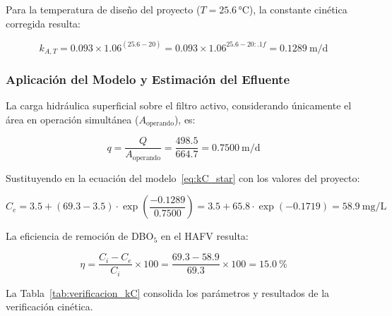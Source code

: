 \documentclass[12pt,a4paper]{article}
\begin{document}
Para la temperatura de diseño del proyecto ($T = 25.6$\,°C), la constante cinética corregida resulta:

\begin{equation}
k_{A,T} = 0.093 \times 1.06^{(25.6 - 20)} = 0.093 \times 1.06^{25.6 - 20:.1f} = 0.1289\ \text{m/d}
\end{equation}

\subsubsection*{Aplicación del Modelo y Estimación del Efluente}

La carga hidráulica superficial sobre el filtro activo, considerando únicamente el área en operación simultánea ($A_\text{operando}$), es:

\begin{equation}
q = \frac{Q}{A_\text{operando}} = \frac{498.5}{664.7} = 0.7500\ \text{m/d}
\end{equation}

Sustituyendo en la ecuación del modelo~\eqref{eq:kC_star} con los valores del proyecto:

\begin{equation}
C_e = 3.5 + (69.3 - 3.5) \cdot \exp\!\left(\frac{-0.1289}{0.7500}\right) = 3.5 + 65.8 \cdot \exp(-0.1719) = 58.9\ \text{mg/L}
\end{equation}

La eficiencia de remoción de DBO$_5$ en el HAFV resulta:

\begin{equation}
\eta = \frac{C_i - C_e}{C_i} \times 100 = \frac{69.3 - 58.9}{69.3} \times 100 = 15.0\ \%
\end{equation}

La Tabla~\ref{tab:verificacion_kC} consolida los parámetros y resultados de la verificación cinética.
\end{document}
